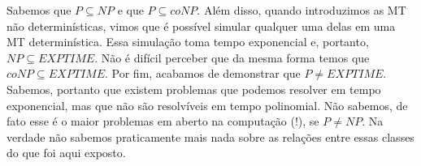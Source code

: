 Sabemos que $P \subseteq NP$ e que $P \subseteq coNP$.
Além disso, quando introduzimos as MT não determinísticas, vimos que é possível simular qualquer uma delas em uma MT determinística.
Essa simulação toma tempo exponencial e, portanto, $NP \subseteq EXPTIME$.
Não é difícil perceber que da mesma forma temos que $coNP \subseteq EXPTIME$.
Por fim, acabamos de demonstrar que $P \neq EXPTIME$.
Sabemos, portanto que existem problemas que podemos resolver em tempo exponencial, mas que não são resolvíveis em tempo polinomial.
Não sabemos, de fato esse é o maior problemas em aberto na computação (!), se $P \neq NP$.
Na verdade não sabemos praticamente mais nada sobre as relações entre essas classes do que foi aqui exposto.


